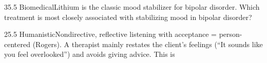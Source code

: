 \documentclass[11pt]{article}
\begin{document}
\begin{q}{3}{5.5 Biomedical}{Lithium is the classic mood stabilizer for bipolar disorder.}
Which treatment is most closely associated with stabilizing mood in bipolar disorder?
\end{q}

\begin{q}{2}{5.5 Humanistic}{Nondirective, reflective listening with acceptance = person-centered (Rogers).}
A therapist mainly restates the client's feelings (``It sounds like you feel overlooked'') and avoids giving advice. This is
\end{q}

\makekey
\end{document}
